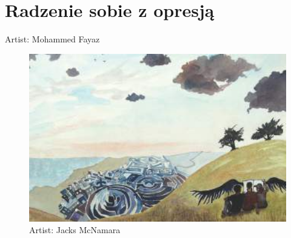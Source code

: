 \chapter{Radzenie sobie z opresją}
Artist: Mohammed Fayaz
\newpage

\begin{figure}[h]
\centering
\includegraphics[width=16cm]{TeX_files/3-1.png}
\caption{Artist: Jacks McNamara}
\label{3-1}
\end{figure}

